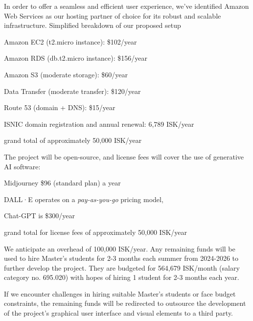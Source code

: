 \documentclass{article}
\begin{document}
    In order to offer a seamless and efficient user experience, we've identified Amazon Web Services as our
    hosting partner of choice for its robust and scalable infrastructure.
    Simplified breakdown of our proposed setup
    \begin{enumerate*}[itemjoin*={{, for }}]
        \item Amazon EC2 (t2.micro instance): \$102/year
        \item Amazon RDS (db.t2.micro instance): \$156/year
        \item Amazon S3 (moderate storage): \$60/year
        \item Data Transfer (moderate transfer): \$120/year
        \item Route 53 (domain + DNS): \$15/year
        \item ISNIC domain registration and annual renewal: 6,789 ISK/year
        \item grand total of approximately 50,000 ISK/year
    \end{enumerate*}

    The project will be open-source, and license fees will cover the use of generative AI software:
    \begin{enumerate*}[itemjoin*={{, for }}]
        \item Midjourney \$96 (standard plan) a year
        \item DALL·E operates on a \emph{pay-as-you-go} pricing model,
        \item Chat-GPT is \$300/year
        \item grand total for license fees of approximately 50,000 ISK/year
    \end{enumerate*}

    We anticipate an overhead of 100,000 ISK/year. Any remaining funds will be used to hire Master's students for 2-3
    months each summer from 2024-2026 to further develop the project.
    They are budgeted for 564,679 ISK/month (salary category no. 695.020) with hopes of hiring 1 student for 2-3
    months each year.

    If we encounter challenges in hiring suitable Master's students or face budget constraints, the remaining funds
    will be redirected to outsource the development of the project's graphical user interface and visual elements to
    a third party.

    \printbibliography
\end{document}
